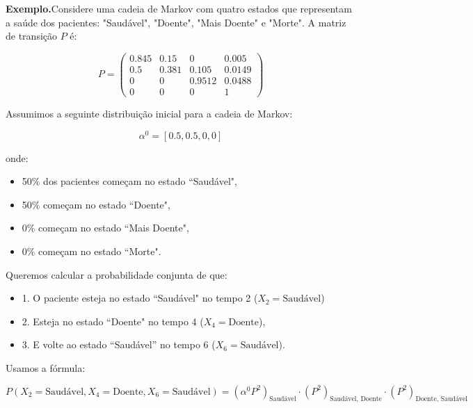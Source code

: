 \documentclass[12pt]{article}
\theoremstyle{break}
\begin{document}
\textbf{Exemplo.}Considere uma cadeia de Markov com quatro estados que representam a saúde dos pacientes: "Saudável", "Doente", "Mais Doente" e "Morte". A matriz de transição \( P \) é:

\[
P = \begin{pmatrix}
0.845 & 0.15 & 0 & 0.005 \\
0.5 & 0.381 & 0.105 & 0.0149 \\
0 & 0 & 0.9512 & 0.0488 \\
0 & 0 & 0 & 1
\end{pmatrix}
\]

Assumimos a seguinte distribuição inicial para a cadeia de Markov:

\[
\alpha^0 = [0.5, 0.5, 0, 0]
\]

onde:

\begin{itemize}
    \item 50\% dos pacientes começam no estado ``Saudável",

    \item 50\% começam no estado ``Doente",

    \item 0\% começam no estado ``Mais Doente",

    \item 0\% começam no estado ``Morte".
\end{itemize}


Queremos calcular a probabilidade conjunta de que:

\begin{itemize}
    \item 1. O paciente esteja no estado ``Saudável" no tempo 2 (\( X_2 = \text{Saudável} \))

    \item 2. Esteja no estado ``Doente" no tempo 4 (\( X_4 = \text{Doente} \)),

    \item 3. E volte ao estado ``Saudável'' no tempo 6 (\( X_6 = \text{Saudável} \)).
\end{itemize}


Usamos a fórmula:

\[
P(X_2 = \text{Saudável}, X_4 = \text{Doente}, X_6 = \text{Saudável}) = (\alpha^0 P^2)_{\text{Saudável}} \cdot (P^2)_{\text{Saudável, Doente}} \cdot (P^2)_{\text{Doente, Saudável}}
\]
\end{document}
